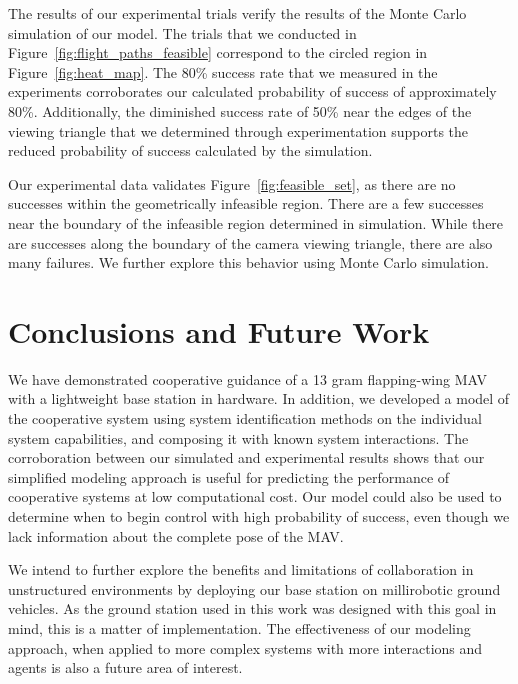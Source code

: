 \documentclass{aamas2013}
\begin{document}
The results of our experimental trials verify the results of the Monte Carlo
simulation of our model. The trials that we conducted in
Figure~\ref{fig:flight_paths_feasible} correspond to the circled region in
Figure~\ref{fig:heat_map}. The 80\% success rate that we measured in the
experiments corroborates our calculated probability of success of
approximately 80\%. Additionally, the diminished success rate of 50\% near the
edges of the viewing triangle that we determined through experimentation
supports the reduced probability of success calculated by the simulation. 

Our experimental data validates Figure~\ref{fig:feasible_set}, as there are 
no successes within the geometrically infeasible region. There are a few 
successes near the boundary of the infeasible region determined in 
simulation. While there are successes along the boundary of the camera 
viewing triangle, there are also many failures. We further explore this 
behavior using Monte Carlo simulation.

\section{Conclusions and Future Work}
We have demonstrated cooperative guidance of a 13 gram flapping-wing MAV with a
lightweight base station in hardware. In addition, we developed a model of the
cooperative system using system identification methods on the individual system capabilities, and composing
it with known system interactions. The corroboration between our simulated and
experimental results shows that our simplified modeling approach is useful for 
predicting the performance of cooperative systems at low computational cost. Our model could also be used to determine when to begin control with high probability of success, even though we lack information about the complete pose of the MAV.

We intend to further explore the benefits and limitations of collaboration in
unstructured environments by deploying our base station on millirobotic ground
vehicles. As the ground station used in this work was designed with this goal
in mind, this is a matter of implementation. The effectiveness of our modeling
approach, when applied to more complex systems with more interactions and 
agents is also a future area of interest. 

\end{document}
